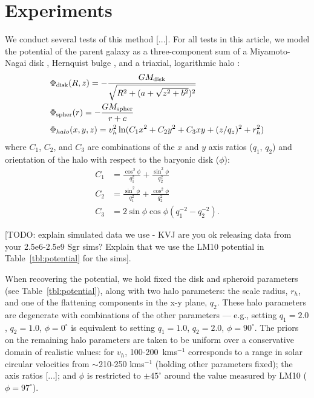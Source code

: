 \documentclass[letterpaper,12pt,preprint]{aastex}
\begin{document}
\section{Experiments}
We conduct several tests of this method [...]. For all tests in this article, we model the potential of the parent galaxy as a three-component sum of a Miyamoto-Nagai disk \citep{}, Hernquist bulge \citep[spheroid][]{}, and a triaxial, logarithmic halo \citep[e.g.,][]{law10}:
\begin{align}
	&\Phi_{\rm disk}(R,z) = -\frac{GM_{\rm disk}}{\sqrt{R^2 + (a + \sqrt{z^2 + b^2})^2}}\\
	&\Phi_{\rm spher}(r) = -\frac{GM_{\rm spher}}{r + c}\\
	&\Phi_{halo}(x,y,z) = v_{h}^2 \ln(C_1 x^2 + C_2 y^2 + C_3 xy + (z/q_z)^2 + r_h^2)
\end{align}
where $C_1$, $C_2$, and $C_3$ are combinations of the $x$ and $y$ axis
ratios ($q_1$, $q_2$) and orientation of the halo with respect to the
baryonic disk ($\phi$):
\begin{align}
  C_1 &= \frac{\cos^2\phi}{q_1^2} + \frac{\sin^2\phi}{q_2^2}\\
  C_2 &= \frac{\sin^2\phi}{q_1^2} + \frac{\cos^2\phi}{q_2^2}\\
  C_3 &= 2\sin\phi\cos\phi \left(q_1^{-2} - q_2^{-2}\right).
\end{align}

[TODO: explain simulated data we use - KVJ are you ok releasing data from your 2.5e6-2.5e9 Sgr sims? Explain that we use the LM10 potential in Table~\ref{tbl:potential} for the sims]. 

When recovering the potential, we hold fixed the disk and spheroid parameters (see Table~\ref{tbl:potential}), along with two halo parameters: the scale radius, $r_h$, and one of the flattening components in the x-y plane, $q_2$. These halo parameters are degenerate with combinations of the other parameters --- e.g., setting $q_1=2.0$, $q_2=1.0$, $\phi=0^\circ$ is equivalent to setting $q_1=1.0$, $q_2=2.0$, $\phi=90^\circ$. The priors on the remaining halo parameters are taken to be uniform over a conservative domain of realistic values: for $v_h$, 100-200~kms$^{-1}$ corresponds to a range in solar circular velocities from $\sim$210-250 kms$^{-1}$ (holding other parameters fixed); the axis ratios [...]; and $\phi$ is restricted to $\pm45^\circ$ around the value measured by LM10 ($\phi = 97^\circ$).
\end{document}
